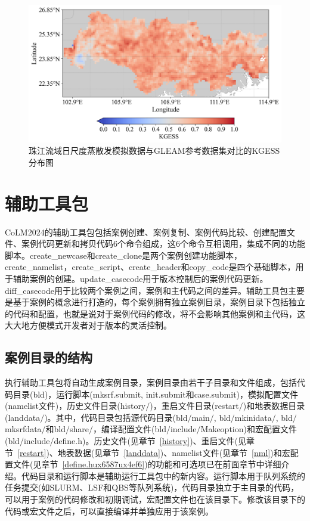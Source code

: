 \begin{figure}[htpb]
    \centering
    \includegraphics[width=\textwidth]{figures/Example07_PearlRiver_unstr_ET_KGESS.jpg}
    \caption{珠江流域日尺度蒸散发模拟数据与GLEAM参考数据集对比的KGESS分布图}
    \label{fig:fig_pearlriver_et_eva}
\end{figure}


\section{辅助工具包}\label{辅助工具包}
CoLM2024的辅助工具包包括案例创建、案例复制、案例代码比较、创建配置文件、案例代码更新和拷贝代码6个命令组成，这6个命令互相调用，集成不同的功能脚本。create\_newcase和create\_clone是两个案例创建功能脚本，create\_namelist，create\_script、create\_header和copy\_code是四个基础脚本，用于辅助案例的创建。update\_casecode用于版本控制后的案例代码更新。diff\_casecode用于比较两个案例之间，案例和主代码之间的差异。辅助工具包主要是基于案例的概念进行打造的，每个案例拥有独立案例目录，案例目录下包括独立的代码和配置，也就是说对于案例代码的修改，将不会影响其他案例和主代码，这大大地方便模式开发者对于版本的灵活控制。

\subsection{案例目录的结构}
执行辅助工具包将自动生成案例目录，案例目录由若干子目录和文件组成，包括代码目录(bld)，运行脚本(mksrf.submit, init.submit和case.submit)，模拟配置文件(namelist文件)，历史文件目录(history$\slash$)，重启文件目录(restart$\slash$)和地表数据目录(landdata$\slash$)。其中，代码目录包括源代码目录(bld$\slash$main$\slash$, bld$\slash$mkinidata$\slash$, bld$\slash$mksrfdata$\slash$和bld$\slash$share$\slash$，编译配置文件(bld$\slash$include$\slash$Makeoption)和宏配置文件(bld$\slash$include$\slash$define.h)。历史文件(见章节~\ref{history})、重启文件(见章节~\ref{restart})、地表数据(见章节~\ref{landdata})、namelist文件(见章节~\ref{nml})和宏配置文件(见章节~\ref{define.hux6587ux4ef6})的功能和可选项已在前面章节中详细介绍。代码目录和运行脚本是辅助运行工具包中的新内容。运行脚本用于队列系统的任务提交(如SLURM、LSF和QBS等队列系统)，代码目录独立于主目录的代码，可以用于案例的代码修改和初期调试，宏配置文件也在该目录下。修改该目录下的代码或宏文件之后，可以直接编译并单独应用于该案例。

